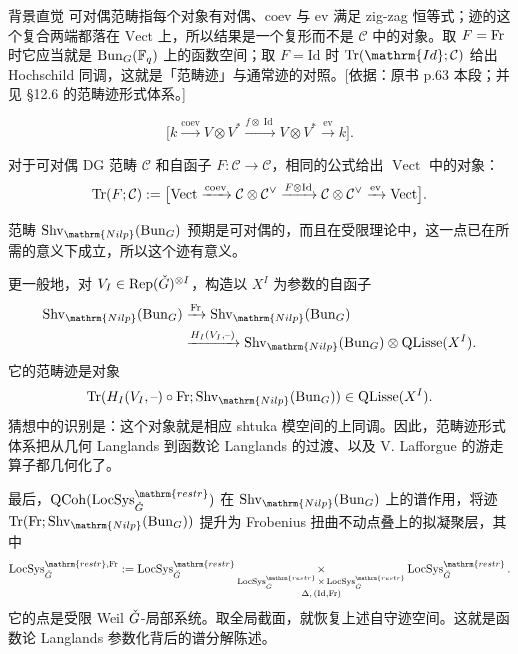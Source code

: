 \begin{transnote}{背景直觉}
可对偶范畴指每个对象有对偶、$\mathrm{coev}$ 与 $\mathrm{ev}$ 满足 zig-zag 恒等式；迹的这个复合两端都落在 $\mathrm{Vect}$ 上，所以结果是一个复形而不是 $\mathcal{C}$ 中的对象。取 $F=\operatorname{Fr}$ 时它应当就是 $\operatorname{Bun}_G(\mathbb F_q)$ 上的函数空间；取 $F=\mathrm{Id}$ 时 $\Tr(\mathrm{Id};\mathcal{C})$ 给出 Hochschild 同调，这就是「范畴迹」与通常迹的对照。[依据：原书 p.63 本段；并见 §12.6 的范畴迹形式体系。]
\end{transnote}
\[\bigl[k\xrightarrow{\operatorname{coev}}V\otimes V^*
\xrightarrow{f\otimes\operatorname{Id}}V\otimes V^*
\xrightarrow{\operatorname{ev}}k\bigr].\]
\begin{definition*}{}
对于可对偶 DG 范畴 $\mathcal C$ 和自函子 $F:\mathcal C\to\mathcal C$，相同的公式给出 $\operatorname{Vect}$ 中的对象：
\[\operatorname{Tr}(F;\mathcal C):=\bigl[\operatorname{Vect}\xrightarrow{\operatorname{coev}}\mathcal C\otimes\mathcal C^\vee
\xrightarrow{F\otimes\operatorname{Id}}\mathcal C\otimes\mathcal C^\vee
\xrightarrow{\operatorname{ev}}\operatorname{Vect}\bigr].\]
\end{definition*}
范畴 $\Shv_{\mathrm{Nilp}}(\Bun_G)$ 预期是可对偶的，而且在受限理论中，这一点已在所需的意义下成立\cite{AGK20b}，所以这个迹有意义。

更一般地，对 $V_I\in\operatorname{Rep}(\check{G})^{\otimes I}$，构造以 $X^I$ 为参数的自函子
\[\begin{split}
\Shv_{\mathrm{Nilp}}(\Bun_G)&\xrightarrow{\Fr}\Shv_{\mathrm{Nilp}}(\Bun_G)\\
&\xrightarrow{H_I(V_I,\text{--})}\Shv_{\mathrm{Nilp}}(\Bun_G)\otimes\operatorname{QLisse}(X^I).
\end{split}\]
它的范畴迹是对象
\[\Tr(H_I(V_I,\text{--})\circ\Fr;\Shv_{\mathrm{Nilp}}(\Bun_G))\in\operatorname{QLisse}(X^I).\]
猜想中的识别是：这个对象就是相应 shtuka 模空间的上同调。因此，范畴迹形式体系把从几何 Langlands 到函数论 Langlands 的过渡、以及 V. Lafforgue 的游走算子都几何化了\cite{Gai16a,Laf18}。

最后，$\QCoh(\LocSys^{\mathrm{restr}}_{\checkG})$ 在 $\Shv_{\mathrm{Nilp}}(\Bun_G)$ 上的谱作用，将迹 $\Tr(\Fr;\Shv_{\mathrm{Nilp}}(\Bun_G))$ 提升为 Frobenius 扭曲不动点叠上的拟凝聚层，其中
\[\LocSys^{\mathrm{restr},\Fr}_{\checkG}:=
\LocSys^{\mathrm{restr}}_{\checkG}\underset{\substack{\LocSys^{\mathrm{restr}}_{\checkG}\times\LocSys^{\mathrm{restr}}_{\checkG}\\\Delta,\,(\operatorname{Id},\Fr)}}{\times}\LocSys^{\mathrm{restr}}_{\checkG}.\]
它的点是受限 Weil $\check{G}$-局部系统。取全局截面，就恢复上述自守迹空间。这就是函数论 Langlands 参数化背后的谱分解陈述。
